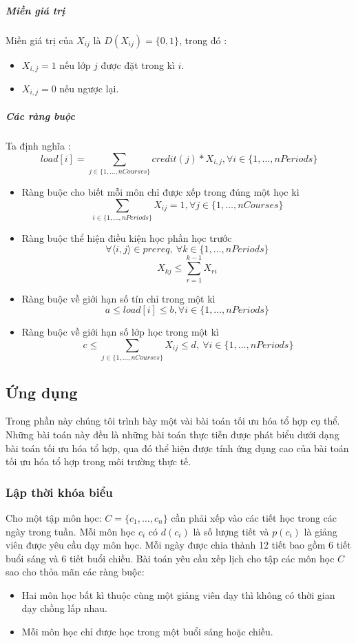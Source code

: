 \documentclass[a4paper,12pt]{report}
\begin{document}
\subparagraph{Miền giá trị}
Miền giá trị của $X_{ij}$ là $D(X_{ij})=\{0,1\}$, trong đó :
\begin{itemize}
\item $X_{i,j}=1$ nếu lớp $j$ được đặt trong kì $i$.
\item $X_{i,j}=0$ nếu ngược lại. 
\end{itemize}
\subparagraph{Các ràng buộc}
Ta định nghĩa : $$load[i]=\sum_{j \in \{1,\dots,nCourses\} } credit(j) *X_{i,j}   ,\forall i \in \{1,\dots,nPeriods\}$$
\begin{itemize}
\item Ràng buộc cho biết mỗi môn chỉ được xếp trong đúng một học kì
$$   \sum_{i \in \{1,\dots,nPeriods\} } X_{ij}=1,\forall j \in\{1,\dots,nCourses\}  $$

\item Ràng buộc thể hiện điều kiện học phần học trước $$ \forall\langle i,j\rangle \in prereq, \ \forall k \in \{1,\dots,nPeriods\} $$
$$X_{kj} \leq \sum^{k-1}_{r=1} X_{ri} $$ 
\item Ràng buộc về giới hạn số tín chỉ trong một kì $$a \leq load[i] \leq b, \forall i \in \{1,\dots,nPeriods\}$$
\item Ràng buộc về giới hạn số lớp học trong một kì $$ \ c \leq \sum_{j \in \{1,\dots,nCourses\}} X_{ij} \leq d , \ \forall i \in \{1,\dots,nPeriods\} $$
\end{itemize}
\subsection{Ứng dụng}
Trong phần này chúng tôi trình bày một vài bài toán tối ưu hóa tổ hợp cụ thể. Những bài toán này đều là những bài toán thực tiễn được phát biểu dưới dạng bài toán tối ưu hóa tổ hợp, qua đó thể hiện được tính ứng dụng cao của bài toán tối ưu hóa tổ hợp trong môi trường thực tế.
\subsubsection{Lập thời khóa biểu}
Cho một tập môn học: $C=\{c_1,\ldots, c_n\}$ cần phải xếp vào các tiết học trong các ngày trong tuần. Mỗi môn học $c_i$ có $d(c_i)$ là số lượng tiết và $p(c_i)$ là giảng viên được yêu cầu dạy môn học. Mỗi ngày được chia thành 12 tiết bao gồm 6 tiết buổi sáng và 6 tiết buổi chiều. Bài toán yêu cầu xếp lịch cho tập các môn học $C$ sao cho thỏa mãn các ràng buộc: \begin{itemize}
\item Hai môn học bất kì thuộc cùng một giảng viên dạy thì không có thời gian dạy chồng lấp nhau.
\item Mỗi môn học chỉ được học trong một buổi sáng hoặc chiều.
\end{itemize}
\end{document}
